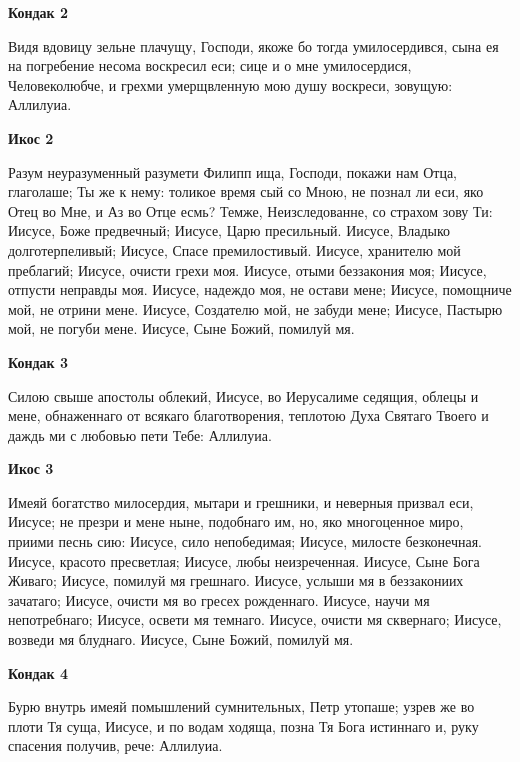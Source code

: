 \medskip


\bfseries Кондак 2\normalfont{}


Видя вдовицу зельне плачущу, Господи, якоже бо тогда умилосердився, сына ея на погребение несома воскресил еси; сице и о мне умилосердися, Человеколюбче, и грехми умерщвленную мою душу воскреси, зовущую: Аллилуиа.


\medskip


\bfseries Икос 2\normalfont{}


Разум неуразуменный разумети Филипп ища, Господи, покажи нам Отца, глаголаше; Ты же к нему: толикое время сый со Мною, не познал ли еси, яко Отец во Мне, и Аз во Отце есмь? Темже, Неизследованне, со страхом зову Ти: Иисусе, Боже предвечный; Иисусе, Царю пресильный. Иисусе, Владыко долготерпеливый; Иисусе, Спасе премилостивый. Иисусе, хранителю мой преблагий; Иисусе, очисти грехи моя. Иисусе, отыми беззакония моя; Иисусе, отпусти неправды моя. Иисусе, надеждо моя, не остави мене; Иисусе, помощниче мой, не отрини мене. Иисусе, Создателю мой, не забуди мене; Иисусе, Пастырю мой, не погуби мене. Иисусе, Сыне Божий, помилуй мя.


\medskip


\bfseries Кондак 3\normalfont{}


Силою свыше апостолы облекий, Иисусе, во Иерусалиме седящия, облецы и мене, обнаженнаго от всякаго благотворения, теплотою Духа Святаго Твоего и даждь ми с любовью пети Тебе: Аллилуиа.


\medskip


\bfseries Икос 3\normalfont{}


Имеяй богатство милосердия, мытари и грешники, и неверныя призвал еси, Иисусе; не презри и мене ныне, подобнаго им, но, яко многоценное миро, приими песнь сию: Иисусе, сило непобедимая; Иисусе, милосте безконечная. Иисусе, красото пресветлая; Иисусе, любы неизреченная. Иисусе, Сыне Бога Живаго; Иисусе, помилуй мя грешнаго. Иисусе, услыши мя в беззакониих зачатаго; Иисусе, очисти мя во гресех рожденнаго. Иисусе, научи мя непотребнаго; Иисусе, освети мя темнаго. Иисусе, очисти мя сквернаго; Иисусе, возведи мя блуднаго. Иисусе, Сыне Божий, помилуй мя.


\medskip


\bfseries Кондак 4\normalfont{}


Бурю внутрь имеяй помышлений сумнительных, Петр утопаше; узрев же во плоти Тя суща, Иисусе, и по водам ходяща, позна Тя Бога истиннаго и, руку спасения получив, рече: Аллилуиа.


\medskip


